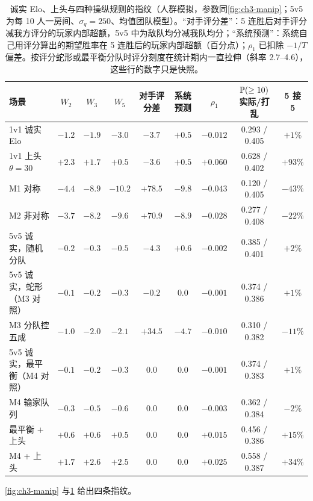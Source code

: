 \begin{table}[htbp]
\centering\small
\caption{诚实 Elo、上头与四种操纵规则的指纹（人群模拟，参数同\cref{fig:ch3-manip}；5v5 为每 10 人一房间、$\sigma_q=250$、均值团队模型）。“对手评分差”：5 连胜后对手评分减我方评分的玩家内部超额，5v5 中为敌队均分减我队均分；“系统预测”：系统自己用评分算出的期望胜率在 5 连胜后的玩家内部超额（百分点）；$\rho_1$ 已扣除 $-1/T$ 偏差。按评分蛇形或最平衡分队时评分刻度在统计期内一直拉伸（斜率 2.7–4.6），这些行的数字只是快照。\tagOwn}
\label{tab:ch3-manip}
\footnotesize
\setlength{\tabcolsep}{3pt}
\begin{tabular}{lcccccccc}
\toprule
场景 & $W_2$ & $W_3$ & $W_5$ & 对手评分差 & 系统预测 & $\rho_1$ & $\mathbb{P}(\ge10)$ 实际/打乱 & 5 接 5 \\
\midrule
1v1 诚实 Elo & $-1.2$ & $-1.9$ & $-3.0$ & $-3.7$ & $+0.5$ & $-0.012$ & 0.293 / 0.405 & $+1\%$ \\
1v1 上头 $\theta=30$ & $+2.3$ & $+1.7$ & $+0.5$ & $-3.6$ & $+0.5$ & $+0.060$ & 0.628 / 0.402 & $+93\%$ \\
M1 对称 & $-4.4$ & $-8.9$ & $-10.2$ & $+78.5$ & $-9.8$ & $-0.043$ & 0.120 / 0.405 & $-43\%$ \\
M2 非对称 & $-3.7$ & $-8.2$ & $-9.6$ & $+70.9$ & $-8.9$ & $-0.028$ & 0.277 / 0.408 & $-22\%$ \\
\midrule
5v5 诚实，随机分队 & $-0.2$ & $-0.3$ & $-0.5$ & $-4.3$ & $+0.6$ & $-0.002$ & 0.385 / 0.401 & $+2\%$ \\
5v5 诚实，蛇形（M3 对照） & $-0.1$ & $-0.2$ & $-0.3$ & $-0.2$ & $0.0$ & $-0.001$ & 0.374 / 0.386 & $+1\%$ \\
M3 分队控五成 & $-1.0$ & $-2.0$ & $-2.1$ & $+34.5$ & $-4.7$ & $-0.010$ & 0.310 / 0.382 & $-11\%$ \\
5v5 诚实，最平衡（M4 对照） & $-0.1$ & $-0.2$ & $-0.3$ & $0.0$ & $0.0$ & $-0.001$ & 0.374 / 0.383 & $+1\%$ \\
M4 输家队列 & $-0.3$ & $-0.5$ & $-0.6$ & $0.0$ & $0.0$ & $-0.003$ & 0.362 / 0.384 & $-2\%$ \\
最平衡 + 上头 & $+0.6$ & $+0.6$ & $+0.5$ & $0.0$ & $0.0$ & $+0.015$ & 0.456 / 0.386 & $+15\%$ \\
M4 + 上头 & $+1.7$ & $+2.6$ & $+2.5$ & $0.0$ & $0.0$ & $+0.025$ & 0.558 / 0.387 & $+34\%$ \\
\bottomrule
\end{tabular}
\end{table}

\cref{fig:ch3-manip} 与\cref{tab:ch3-manip} 给出四条指纹\tagOwn{}。

